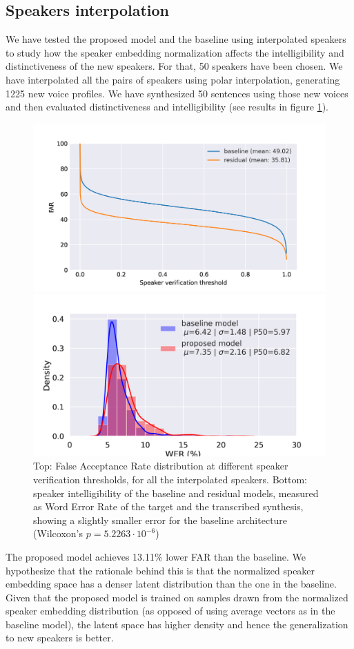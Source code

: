 \subsection{Speakers interpolation}
We have tested the proposed model and the baseline using interpolated speakers to study how the speaker embedding normalization affects the intelligibility and distinctiveness of the new speakers. For that, 50 speakers have been chosen. We have interpolated all the pairs of speakers using polar interpolation, generating 1225 new voice profiles. We have synthesized 50 sentences using those new voices and then evaluated distinctiveness and intelligibility (see results in figure  \ref{fig:svps}).
\begin{figure}[h!]
	\centering
	\includegraphics[width=0.7\linewidth]{tts/images/far_svps}


	\includegraphics[width=0.7\linewidth]{tts/images/wer_svps}
	\caption{Top: False Acceptance Rate distribution at different speaker verification thresholds, for all the interpolated speakers. Bottom: speaker intelligibility of the baseline and residual models, measured as Word Error Rate of the target and the transcribed synthesis, showing a slightly smaller error for the baseline architecture (Wilcoxon's $p=5.2263\cdot 10^{-6}$)}
	\label{fig:svps}
\end{figure}

The proposed model achieves 13.11\% lower FAR than the baseline. We hypothesize that the rationale behind this is that the normalized speaker embedding space has a denser latent distribution than the one in the baseline. Given that the proposed model is trained on samples drawn from the normalized speaker embedding distribution (as opposed of using average vectors as in the baseline model), the latent space has higher density and hence the generalization to new speakers is better.




